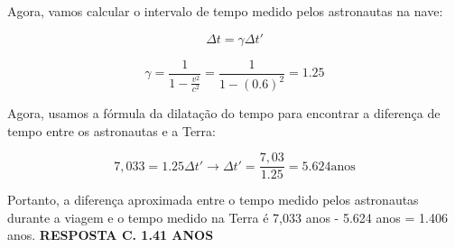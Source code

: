 \documentclass{article}
\begin{document}
Agora, vamos calcular o intervalo de tempo medido pelos astronautas na nave:

\begin{equation} 
\Delta t = \gamma\Delta t'
\end{equation}

\begin{equation}
    \gamma = \frac{1}{1-\frac{v^2}{c^2}} = \frac{1}{1-(0.6)^2} = 1.25
\end{equation}

Agora, usamos a fórmula da dilatação do tempo para encontrar a diferença de tempo entre os astronautas e a Terra:

\begin{equation} 
    7,033 = 1.25\Delta t' \rightarrow \Delta t' = \frac{7,03}{1.25} = 5.624 \textrm{anos}
\end{equation}

Portanto, a diferença aproximada entre o tempo medido pelos astronautas durante a viagem e o tempo medido na 
Terra \'e 7,033 anos - 5.624 anos = 1.406 anos. \textbf{RESPOSTA C. 1.41 ANOS}
    
\end{document}
